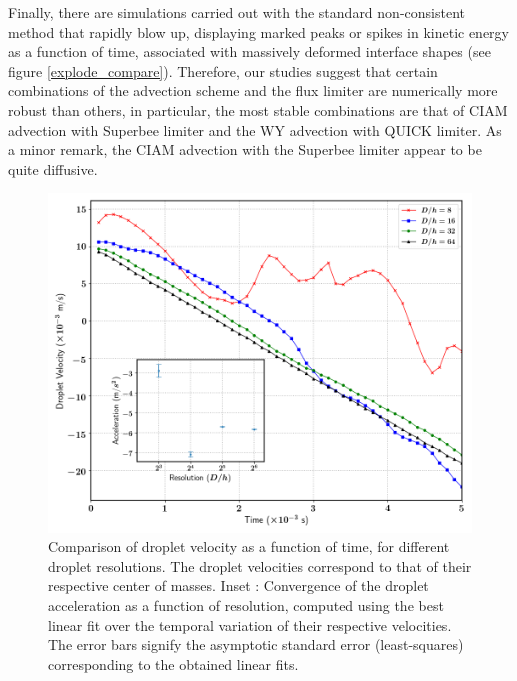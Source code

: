 Finally, there are simulations carried out with the standard 
non-consistent method that rapidly blow up, displaying marked peaks 
or spikes in kinetic energy as a function of time, 
associated with massively deformed interface shapes (see figure \ref{explode_compare}). 
Therefore, our studies suggest that certain combinations 
of the advection scheme and the flux limiter are 
numerically more robust than others, in particular, the most stable combinations 
are that of CIAM advection with 
Superbee limiter and the WY advection with QUICK limiter. 
As a minor remark, the CIAM advection with the Superbee limiter appear to be quite diffusive. 

\begin{figure}
\begin{center}
\includegraphics[width = 1.0\textwidth]{plots/raindrop/dropl_velocity_accel_ppd.png}
\end{center}
\vspace*{-0.5cm}
\caption{Comparison of droplet velocity as a function of time, 
for different droplet resolutions. 
The droplet velocities correspond to that of their respective center of masses. 
Inset : Convergence of the droplet acceleration as a function of resolution, 
computed using the best linear fit over the temporal variation 
of their respective velocities. 
The error bars signify the asymptotic standard 
error (least-squares) corresponding to the obtained linear fits.} 
\label{drop_vel}
\end{figure}

